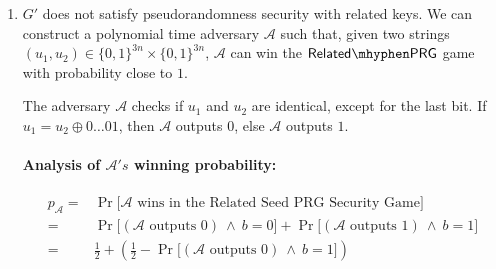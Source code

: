 \documentclass[10pt,addpoints]{exam}
\newcommand{\prob}[1]{\Pr\Big[ #1 \Big]}
\newcommand{\calA}{\mathcal{A}}
\newcommand{\calB}{\mathcal{B}}
\theoremstyle{definition}
\newcommand{\relatedprg}{\mathsf{Related\mhyphen PRG}}
\begin{document}
\begin{enumerate}
\begin{proof}
\begin{enumerate}
            \item $b = 1$: $\calB$ receives $u \gets \{0,1\}^{2n}$, chooses $s_2 \gets \{0,1\}^n$ and sends $u||s_2$ to $\calA$, hence $u_{\calA} = u||s_2 \gets \{0,1\}^{3n}$
        \end{enumerate}
        Using these observations, we can conclude that
        \begin{align*}
            & \prob{\left(\calA \text{ outputs }0\right) ~     \wedge ~ b=0} +  
                \prob{\left(\calA \text{ outputs }1\right) ~ \wedge ~ b=1} \\
            = & \prob{\calA \text{ gets } u_{\calA} = G'(s'), ~ s' \gets \{0,1\}^{2n} ~ \wedge ~ \left(\calA \text{ outputs }0\right)} + \prob{\calA \text{ gets } u_{\calA} \gets \{0,1\}^{3n} ~ \wedge ~ \left(\calA \text{ outputs }1\right)} \\
            = & \prob{\calA \text{ wins the PRG security game against }G'} \\
            = & 1/2 + \epsilon
        \end{align*}

    \end{proof}

    \item $G'$ does not satisfy pseudorandomness security with related keys. We can construct a polynomial time adversary $\calA$ such that, given two strings $(u_1, u_2) \in \{0,1\}^{3n} \times \{0,1\}^{3n}$, $\calA$ can win the $\relatedprg$ game with probability close to $1$.  
    
    
    
    The adversary $\calA$ checks if $u_1$ and $u_2$ are identical, except for the last bit. If ${u_1} = {u_2} \oplus 0\ldots0 1$, then $\calA$ outputs $0$, else $\calA$ outputs $1$. 

    \paragraph{Analysis of $\calA's$ winning probability:} 
    \begin{align*}
        p_{\calA} = & \prob{\calA \text{ wins in the Related Seed PRG Security Game}} \\
        = &\prob{\left(\calA \text{ outputs }0\right) ~ \wedge ~ b=0} +  
        \prob{\left(\calA \text{ outputs }1\right) ~ \wedge ~ b=1}\\
        = &\frac{1}{2} + \left(\frac{1}{2} - \prob{\left(\calA \text{ outputs }0 \right) ~ \wedge ~ b=1}\right)
    \end{align*}
    

\end{enumerate}
\end{document}
